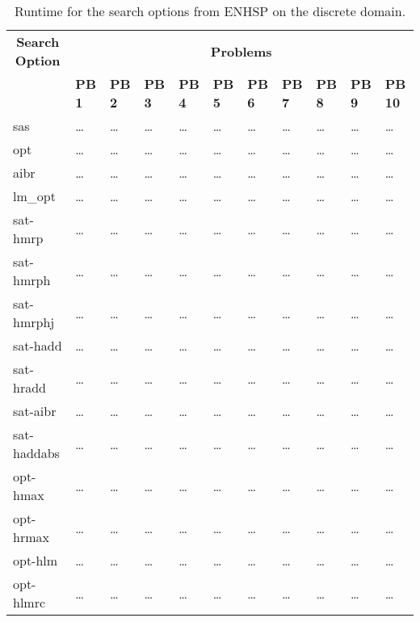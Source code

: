 \begin{sidewaystable}
    \centering
    \caption{Runtime for the search options from ENHSP on the discrete domain.}\label{tab:discrete-experiment-results}
    \begin{tabular}{p{3cm} *{10}{p{1.523cm}}}
        \toprule
        \multicolumn{1}{c}{\textbf{Search Option}} & \multicolumn{10}{c}{\textbf{Problems}} \\
        \cmidrule(lr){2-11}
        & \textbf{PB 1} & \textbf{PB 2} & \textbf{PB 3} & \textbf{PB 4} & \textbf{PB 5} & \textbf{PB 6} & \textbf{PB 7} & \textbf{PB 8} & \textbf{PB 9} & \textbf{PB 10} \\
        \midrule
        sas & \dots & \dots & \dots & \dots & \dots & \dots & \dots & \dots & \dots & \dots \\
        opt & \dots & \dots & \dots & \dots & \dots & \dots & \dots & \dots & \dots & \dots \\
        aibr & \dots & \dots & \dots & \dots & \dots & \dots & \dots & \dots & \dots & \dots \\
        lm\_opt & \dots & \dots & \dots & \dots & \dots & \dots & \dots & \dots & \dots & \dots \\
        sat-hmrp & \dots & \dots & \dots & \dots & \dots & \dots & \dots & \dots & \dots & \dots \\
        sat-hmrph & \dots & \dots & \dots & \dots & \dots & \dots & \dots & \dots & \dots & \dots \\
        sat-hmrphj & \dots & \dots & \dots & \dots & \dots & \dots & \dots & \dots & \dots & \dots \\
        sat-hadd & \dots & \dots & \dots & \dots & \dots & \dots & \dots & \dots & \dots & \dots \\
        sat-hradd & \dots & \dots & \dots & \dots & \dots & \dots & \dots & \dots & \dots & \dots \\
        sat-aibr & \dots & \dots & \dots & \dots & \dots & \dots & \dots & \dots & \dots & \dots \\
        sat-haddabs & \dots & \dots & \dots & \dots & \dots & \dots & \dots & \dots & \dots & \dots \\
        opt-hmax & \dots & \dots & \dots & \dots & \dots & \dots & \dots & \dots & \dots & \dots \\
        opt-hrmax & \dots & \dots & \dots & \dots & \dots & \dots & \dots & \dots & \dots & \dots \\
        opt-hlm & \dots & \dots & \dots & \dots & \dots & \dots & \dots & \dots & \dots & \dots \\
        opt-hlmrc & \dots & \dots & \dots & \dots & \dots & \dots & \dots & \dots & \dots & \dots \\
        \bottomrule
    \end{tabular}
\end{sidewaystable}
